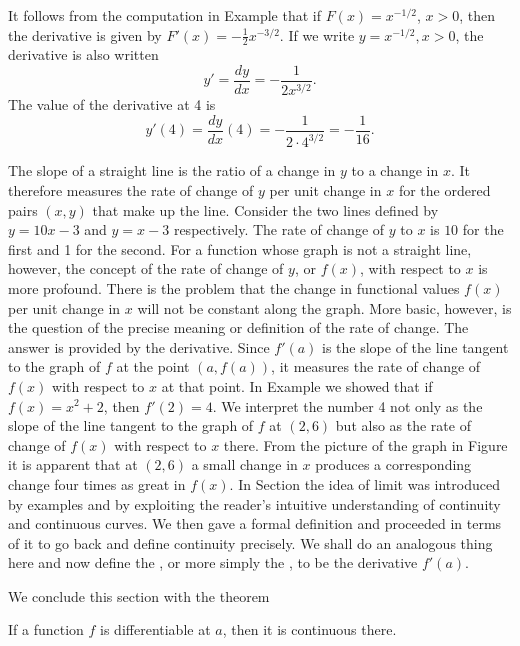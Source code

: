 \begin{example}{\label{exam 1.6.6}}
It follows from the computation in Example 
that if $F(x) = x^{-1/2}$, $x > 0$,
then the derivative is given by
$F'(x) = -\frac{1}{2} x^{-3/2}$.
If we write $y = x^{-1/2}, x > 0$,
the derivative is also written
$$
y' = \frac{dy}{dx} = - \frac{1}{2 x^{3/2}} .
$$
The value of the derivative at 4 is
$$
y'(4) = {\frac{dy}{dx}} (4) = - \frac{1}{2 \cdot 4^{3/2}} = - \frac{1}{16} .
$$
\end{example}

The slope of a straight line is the ratio of
a change in $y$ to a change in $x$.
It therefore measures the rate of change of $y$ per unit change in $x$
for the ordered pairs $(x, y)$ that make up the line.
Consider the two lines defined by
$y = 10x - 3$  and $y = x - 3$ respectively.
The rate of change of $y$ to $x$ is $10$ for the first
and 1 for the second.
For a function whose graph is not a straight line, however,
the concept of the rate of change of $y$, or $f(x)$,
with respect to $x$ is more profound.
There is the problem that
the change in functional values $f(x)$ per unit change in $x$
will not be constant along the graph.
More basic, however,
is the question of the precise meaning or definition
of the rate of change.
The answer is provided by the derivative.
Since $f'(a)$ is the slope of the line tangent to the graph of $f$
at the point $(a, f(a))$,
it measures the rate of change of $f(x)$
with respect to $x$ at that point.
In Example 
we showed that if $f(x) = x^2 + 2$,
then $f'(2) = 4$.
We interpret the number 4
not only as the slope of the line tangent to the graph of $f$ at $(2, 6)$
but also as the rate of change of $f(x)$ with respect to $x$ there.
From the picture of the graph in Figure 
it is apparent that at $(2, 6)$
a small change in $x$
produces a corresponding change four times as great in $f(x)$.
In Section  the idea of limit was introduced by examples
and by exploiting the reader's intuitive understanding
of continuity and continuous curves.
We then gave a formal definition
and proceeded in terms of it to go back and define continuity precisely.
We shall do an analogous thing here and now define the
,
or more simply the
,
to be the derivative $f'(a)$.

We conclude this section with the theorem

\begin{prop}\label{thm 1.6.1}
If a function $f$ is differentiable at $a$, then it is continuous there.
\end{prop}

